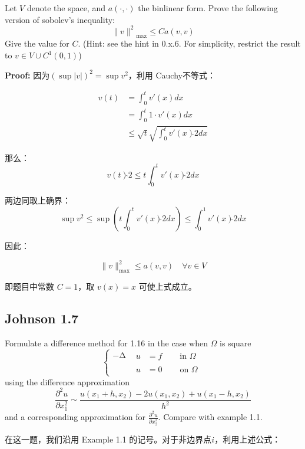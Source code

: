 \documentclass[UTF8]{ctexart}
\begin{document}
Let \(V\) denote the space, and \(a( \cdot , \cdot )\) the binlinear
form. Prove the following version of sobolev's inequality:
\[{\left. \parallel v \right.\parallel^{2}}_{\max} \leq Ca(v,v)\] Give
the value for \(C\). (Hint: see the hint in 0.x.6. For simplicity,
restrict the result to \(v \in V \cup C^{1}(0,1)\))

\textbf{Proof:} 因为\(\left( \sup|v| \right)^{2} = \sup v^{2}\)，利用
Cauchy不等式：

\[\begin{aligned}
v(t) & = \int_{0}^{t}v\prime(x)dx \\
 & = \int_{0}^{t}1 \cdot v\prime(x)dx \\
 & \leq \sqrt{t}\sqrt{\int_{0}^{t}v\prime(x)\hat{}2dx}
\end{aligned}\]

那么： \[v(t)\hat{}2 \leq t\int_{0}^{t}v\prime(x)\hat{}2dx\]

两边同取上确界：
\[\sup v^{2} \leq \sup\left( t\int_{0}^{t}v\prime(x)\hat{}2dx \right) \leq \int_{0}^{1}v\prime(x)\hat{}2dx\]

因此：

\[\left. \parallel v \right.\parallel_{\max}^{2} \leq a(v,v)\quad\forall v \in V\]

即题目中常数 \(C = 1\)，取 \(v(x) = x\) 可使上式成立。

\subsection{Johnson 1.7}

Formulate a difference method for 1.16 in the case when \(\Omega\) is
square \[\begin{cases}
 - \mathrm{\Delta} & \begin{array}{rlr}
u & = f & \quad\text{ in }\Omega
\end{array} \\
 & \begin{array}{rlr}
u & = 0 & \quad\text{ on }\Omega
\end{array}
\end{cases}\] using the difference approximation
\[\frac{\partial^{2}u}{\partial x_{1}^{2}}\sim\frac{u\left( x_{1} + h,x_{2} \right) - 2u\left( x_{1},x_{2} \right) + u\left( x_{1} - h,x_{2} \right)}{h^{2}}\]
and a corresponding approximation for
\(\frac{\partial^{2}u}{\partial x_{2}^{2}}\). Compare with example 1.1.

在这一题，我们沿用 Example 1.1 的记号。对于非边界点\(i\)，利用上述公式：
\end{document}
